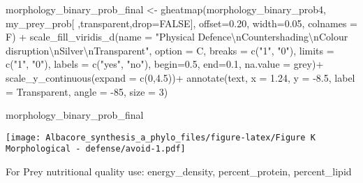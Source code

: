 \documentclass[
]{article}
\newenvironment{Shaded}{\begin{snugshade}}{\end{snugshade}}
\newcommand{\AttributeTok}[1]{\textcolor[rgb]{0.77,0.63,0.00}{#1}}
\newcommand{\ConstantTok}[1]{\textcolor[rgb]{0.00,0.00,0.00}{#1}}
\newcommand{\DecValTok}[1]{\textcolor[rgb]{0.00,0.00,0.81}{#1}}
\newcommand{\FloatTok}[1]{\textcolor[rgb]{0.00,0.00,0.81}{#1}}
\newcommand{\FunctionTok}[1]{\textcolor[rgb]{0.00,0.00,0.00}{#1}}
\newcommand{\NormalTok}[1]{#1}
\newcommand{\OtherTok}[1]{\textcolor[rgb]{0.56,0.35,0.01}{#1}}
\newcommand{\SpecialCharTok}[1]{\textcolor[rgb]{0.00,0.00,0.00}{#1}}
\newcommand{\StringTok}[1]{\textcolor[rgb]{0.31,0.60,0.02}{#1}}
\begin{document}
\begin{Shaded}
\begin{Highlighting}[]
\NormalTok{morphology\_binary\_prob\_final }\OtherTok{\textless{}{-}} \FunctionTok{gheatmap}\NormalTok{(morphology\_binary\_prob4, my\_prey\_prob[ ,}\StringTok{\textquotesingle{}transparent\textquotesingle{}}\NormalTok{,}\AttributeTok{drop=}\ConstantTok{FALSE}\NormalTok{], }
                                         \AttributeTok{offset=}\FloatTok{0.20}\NormalTok{, }\AttributeTok{width=}\FloatTok{0.05}\NormalTok{, }\AttributeTok{colnames =}\NormalTok{ F) }\SpecialCharTok{+}
  \FunctionTok{scale\_fill\_viridis\_d}\NormalTok{(}\AttributeTok{name =} \StringTok{"Physical Defence}\SpecialCharTok{\textbackslash{}n}\StringTok{Countershading}\SpecialCharTok{\textbackslash{}n}\StringTok{Colour disruption}\SpecialCharTok{\textbackslash{}n}\StringTok{Silver}\SpecialCharTok{\textbackslash{}n}\StringTok{Transparent"}\NormalTok{, }
                       \AttributeTok{option =} \StringTok{\textquotesingle{}C\textquotesingle{}}\NormalTok{,}
                       \AttributeTok{breaks =} \FunctionTok{c}\NormalTok{(}\StringTok{"1"}\NormalTok{, }\StringTok{"0"}\NormalTok{),}
                       \AttributeTok{limits =} \FunctionTok{c}\NormalTok{(}\StringTok{"1"}\NormalTok{, }\StringTok{"0"}\NormalTok{),}
                       \AttributeTok{labels =} \FunctionTok{c}\NormalTok{(}\StringTok{"yes"}\NormalTok{, }\StringTok{"no"}\NormalTok{),}
                       \AttributeTok{begin=}\FloatTok{0.5}\NormalTok{, }\AttributeTok{end=}\FloatTok{0.1}\NormalTok{, }
                       \AttributeTok{na.value =} \StringTok{\textquotesingle{}grey\textquotesingle{}}\NormalTok{)}\SpecialCharTok{+}
  \FunctionTok{scale\_y\_continuous}\NormalTok{(}\AttributeTok{expand =} \FunctionTok{c}\NormalTok{(}\DecValTok{0}\NormalTok{,}\FloatTok{4.5}\NormalTok{))}\SpecialCharTok{+}
  \FunctionTok{annotate}\NormalTok{(}\StringTok{\textquotesingle{}text\textquotesingle{}}\NormalTok{, }\AttributeTok{x =} \FloatTok{1.24}\NormalTok{, }\AttributeTok{y =} \SpecialCharTok{{-}}\FloatTok{8.5}\NormalTok{, }\AttributeTok{label =} \StringTok{\textquotesingle{}Transparent\textquotesingle{}}\NormalTok{, }\AttributeTok{angle =} \SpecialCharTok{{-}}\DecValTok{85}\NormalTok{, }\AttributeTok{size =} \DecValTok{3}\NormalTok{)}

\NormalTok{morphology\_binary\_prob\_final}
\end{Highlighting}
\end{Shaded}

\texttt{[image: Albacore\_synthesis\_a\_phylo\_files/figure-latex/Figure K Morphological - defense/avoid-1.pdf]}

For Prey nutritional quality use: energy\_density, percent\_protein,
percent\_lipid
\end{document}
